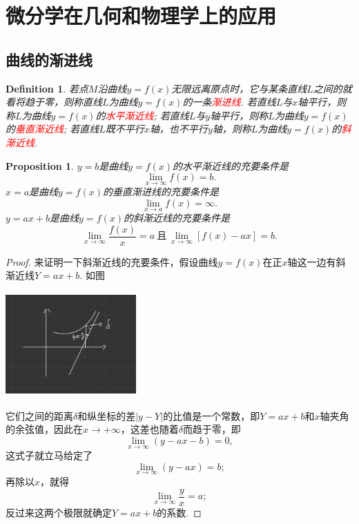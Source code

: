 \documentclass{article}
\newtheorem{proposition}[theorem]{Proposition}
\newtheorem{definition}[theorem]{Definition}
\newcommand{\redt}[1]{\textcolor{red}{#1}}
\begin{document}
\newpage
\section{微分学在几何和物理学上的应用}

\subsection{曲线的渐进线}

\begin{definition}
\rm 若点$M$沿曲线$y=f(x)$无限远离原点时，它与某条直线$L$之间的就看将趋于零，则称直线$L$为曲线$y=f(x)$的一条\redt{渐进线}. 若直线$L$与$x$轴平行，则称$L$为曲线$y=f(x)$的\redt{水平渐近线}; 若直线$L$与$y$轴平行，则称$L$为曲线$y=f(x)$的\redt{垂直渐近线}; 若直线$L$既不平行$x$轴，也不平行$y$轴，则称$L$为曲线$y=f(x)$的\redt{斜渐近线}. 
\end{definition}

\begin{proposition}
\rm $y=b$是曲线$y=f(x)$的水平渐近线的充要条件是
$$
\lim\limits_{x \to \infty} f(x)= b.
$$
$x=a$是曲线$y=f(x)$的垂直渐进线的充要条件是
$$
\lim\limits_{x \to a} f(x) = \infty.
$$
$y=ax+b$是曲线$y=f(x)$的斜渐近线的充要条件是
$$
\lim\limits_{x \to \infty} \frac{f(x)}{x} = a ~\text{且}~ \lim\limits_{x \to  \infty} [f(x)-ax ] =b.
$$
\end{proposition}

\begin{proof}
来证明一下斜渐近线的充要条件，假设曲线$y=f(x)$在正$x$轴这一边有斜渐近线$Y=ax+b$. 如图
\begin{center}
\includegraphics[width=5cm, height=4cm]{images/asymptotic_line.jpg}
\end{center}
它们之间的距离$\delta$和纵坐标的差$|y-Y|$的比值是一个常数，即$Y=ax+b$和$x$轴夹角的余弦值，因此在$x \to +\infty$，这差也随着$\delta$而趋于零，即
$$
\lim\limits_{x \to \infty} (y-ax-b) = 0,
$$
这式子就立马给定了
$$
\lim\limits_{x \to \infty} (y-ax) =b;
$$
再除以$x$，就得
$$
\lim\limits_{x \to \infty} \frac{y}{x} = a;
$$
反过来这两个极限就确定$Y=ax+b$的系数. 
\end{proof}
\end{document}
